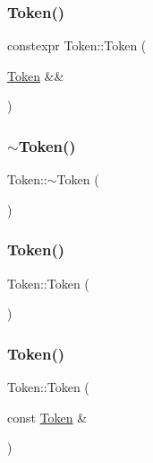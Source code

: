 \mbox{\label{class_token_a23120d04c491e1808de2c15a5f9de2a1}} 
\subsubsection{\texorpdfstring{Token()}{Token()}\hspace{0.1cm}{\footnotesize\ttfamily [10/16]}}
{\footnotesize\ttfamily constexpr Token\+::\+Token (\begin{DoxyParamCaption}\item[{\hyperlink{class_token}{Token} \&\&}]{ }\end{DoxyParamCaption})\hspace{0.3cm}{\ttfamily [default]}}

\mbox{\label{class_token_aa192083f24d5d5895ad91b20ff0e3399}} 
\subsubsection{\texorpdfstring{$\sim$\+Token()}{~Token()}}
{\footnotesize\ttfamily Token\+::$\sim$\+Token (\begin{DoxyParamCaption}{ }\end{DoxyParamCaption})\hspace{0.3cm}{\ttfamily [default]}}

\mbox{\label{class_token_a761bf97d165988a4250dc26500d36f89}} 
\subsubsection{\texorpdfstring{Token()}{Token()}\hspace{0.1cm}{\footnotesize\ttfamily [11/16]}}
{\footnotesize\ttfamily Token\+::\+Token (\begin{DoxyParamCaption}{ }\end{DoxyParamCaption})\hspace{0.3cm}{\ttfamily [default]}}

\mbox{\label{class_token_a350ebd7ea16caa846b858ecdb1c273c6}} 
\subsubsection{\texorpdfstring{Token()}{Token()}\hspace{0.1cm}{\footnotesize\ttfamily [12/16]}}
{\footnotesize\ttfamily Token\+::\+Token (\begin{DoxyParamCaption}\item[{const \hyperlink{class_token}{Token} \&}]{ }\end{DoxyParamCaption})\hspace{0.3cm}{\ttfamily [default]}}

